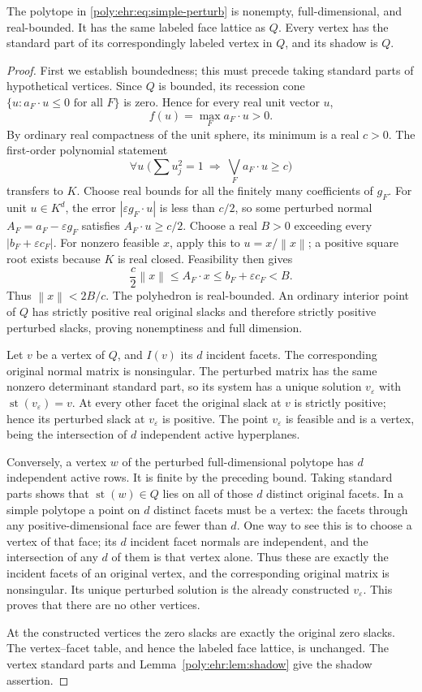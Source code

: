 \documentclass[11pt,a4paper]{article}
\numberwithin{equation}{section}
\theoremstyle{plain}
\newcommand{\eps}{\varepsilon}
\newcommand{\st}{\operatorname{st}}
\newcommand{\norm}[1]{\left\lVert #1\right\rVert}
\begin{document}
\begin{lemma}\label{poly:ehr:lem:simple}
The polytope in \eqref{poly:ehr:eq:simple-perturb} is nonempty, full-dimensional,
and real-bounded. It has the same labeled face lattice as $Q$. Every
vertex has the standard part of its correspondingly labeled vertex in
$Q$, and its shadow is $Q$.
\end{lemma}
\begin{proof}
First we establish boundedness; this must precede taking standard parts
of hypothetical vertices. Since $Q$ is bounded, its recession cone
$\{u:a_F\cdot u\leq0\text{ for all }F\}$ is zero. Hence for every real
unit vector $u$,
\[
 f(u)=\max_F a_F\cdot u>0.
\]
By ordinary real compactness of the unit sphere, its minimum is a real
$c>0$. The first-order polynomial statement
\[
 \forall u\;\bigl(\sum u_j^2=1\ \Longrightarrow\
                         \bigvee_F a_F\cdot u\geq c\bigr)
\]
transfers to $K$. Choose real bounds for all the finitely many coefficients
of $g_F$. For unit $u\in K^d$, the error
$|\eps g_F\cdot u|$ is less than $c/2$, so some perturbed normal
$A_F=a_F-\eps g_F$ satisfies $A_F\cdot u\geq c/2$.
Choose a real $B>0$ exceeding every $|b_F+\eps c_F|$.
For nonzero feasible $x$, apply this to $u=x/\norm{x}$; a positive square
root exists because $K$ is real closed. Feasibility then gives
\[
 \frac c2\norm{x}\leq A_F\cdot x\leq b_F+\eps c_F<B.
\]
Thus $\norm{x}<2B/c$. The polyhedron is real-bounded. An ordinary interior
point of $Q$ has strictly positive real original slacks and therefore
strictly positive perturbed slacks, proving nonemptiness and full dimension.

Let $v$ be a vertex of $Q$, and $I(v)$ its $d$ incident facets. The
corresponding original normal matrix is nonsingular. The perturbed matrix
has the same nonzero determinant standard part, so its system has a unique
solution $v_\eps$ with $\st(v_\eps)=v$. At every other facet the original
slack at $v$ is strictly positive; hence its perturbed slack at $v_\eps$
is positive. The point $v_\eps$ is feasible and is a vertex, being the
intersection of $d$ independent active hyperplanes.

Conversely, a vertex $w$ of the perturbed full-dimensional polytope has
$d$ independent active rows. It is finite by the preceding bound. Taking
standard parts shows that $\st(w)\in Q$ lies on all of those $d$ distinct
original facets. In a simple polytope a point on $d$ distinct facets must
be a vertex: the facets through any positive-dimensional face are fewer
than $d$. One way to see this is to choose a vertex of that face; its
$d$ incident facet normals are independent, and the intersection of any
$d$ of them is that vertex alone. Thus these are exactly the incident
facets of an original vertex, and the corresponding original matrix is
nonsingular. Its unique perturbed solution is the already constructed
$v_\eps$. This proves that there are no other vertices.

At the constructed vertices the zero slacks are exactly the original zero
slacks. The vertex--facet table, and hence the labeled face lattice, is
unchanged. The vertex standard parts and Lemma~\ref{poly:ehr:lem:shadow} give the
shadow assertion.
\end{proof}
\end{document}
